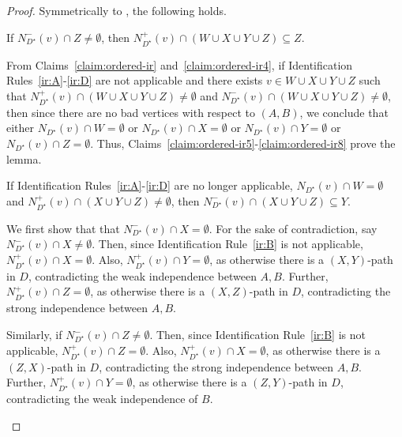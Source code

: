\begin{proof}
Symmetrically to , the following holds.

\begin{claim}\label{claim:ordered-ir4}
If $N_{D^{\star}}^-(v) \cap Z \neq \emptyset$, then
$ N_{D^{\star}}^+(v) \cap (W \cup X \cup Y \cup Z) \subseteq Z$. 
\end{claim}

From Claims~\ref{claim:ordered-ir} and~\ref{claim:ordered-ir4}, if Identification Rules~\ref{ir:A}-\ref{ir:D} are not applicable and there exists $v \in W \cup X \cup Y \cup Z$ such that $N_{D^{\star}}^+(v) \cap (W \cup X \cup Y \cup Z) \neq \emptyset$ and $N_{D^{\star}}^-(v) \cap (W \cup X \cup Y \cup Z) \neq \emptyset$, then since there are no bad vertices with respect to $(A,B)$, we conclude that either $N_{D^{\star}}(v) \cap W =\emptyset$ or $N_{D^{\star}}(v) \cap X =\emptyset$ or $N_{D^{\star}}(v) \cap Y=\emptyset$ or $N_{D^{\star}}(v) \cap Z =\emptyset$. Thus, Claims~\ref{claim:ordered-ir5}-\ref{claim:ordered-ir8} prove the lemma.

\begin{claim}\label{claim:ordered-ir5}
If Identification Rules~\ref{ir:A}-\ref{ir:D} are no longer applicable, $N_{D^{\star}}(v) \cap W=\emptyset$ and  $N_{D^{\star}}^+(v) \cap (X \cup Y \cup Z) \neq \emptyset$, then $N_{D^{\star}}^-(v) \cap (X \cup Y \cup Z) \subseteq Y$.
\end{claim}

\begin{claimproof}
We first show that that $N_{D^{\star}}^-(v) \cap X = \emptyset$. 
For the sake of contradiction, say $N_{D^{\star}}^-(v) \cap X \neq \emptyset$. 
Then, since Identification Rule~\ref{ir:B} is not applicable, $N_{D^{\star}}^+(v) \cap X = \emptyset$.  Also, $N_{D^{\star}}^+(v) \cap Y = \emptyset$, as otherwise there is a $(X,Y)$-path in $D$, contradicting the weak independence between $A,B$. Further, $N_{D^{\star}}^+(v) \cap Z = \emptyset$, as otherwise there is a $(X,Z)$-path in $D$, contradicting the strong independence between $A,B$.

Similarly, if $N_{D^{\star}}^-(v) \cap Z \neq \emptyset$. 
Then, since Identification Rule~\ref{ir:B} is not applicable, $N_{D^{\star}}^+(v) \cap Z = \emptyset$.  Also, 
$N_{D^{\star}}^+(v) \cap X = \emptyset$, as otherwise there is a $(Z,X)$-path in $D$, contradicting the strong independence between $A,B$. Further, 
$N_{D^{\star}}^+(v) \cap Y = \emptyset$, as otherwise there is a $(Z,Y)$-path in $D$, contradicting the weak independence of $B$.
\end{claimproof}


\end{proof}
